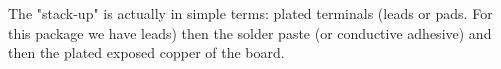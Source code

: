 \documentclass[final]{cubedoc}
\begin{document}

The "stack-up" is actually in simple terms: plated terminals (leads or pads. For this package we have leads) then the solder paste (or conductive adhesive) and then the plated exposed copper of the board. 

 
 




\end{document}
